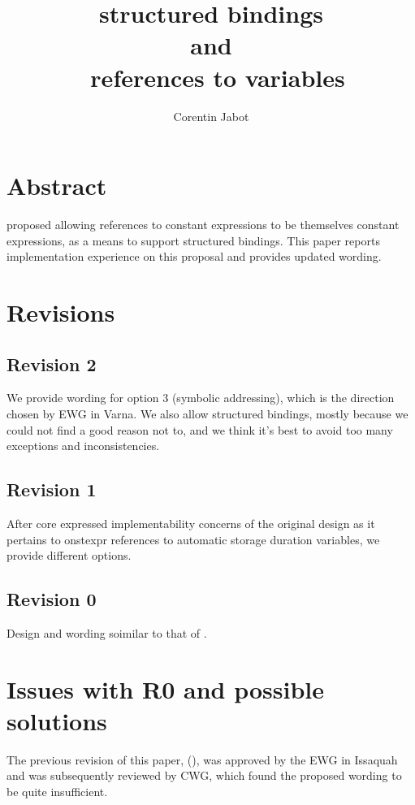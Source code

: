 \documentclass{wg21}
\title{\tcode{constexpr} structured bindings\\{\small and}\\\ references to \tcode{constexpr} variables}
\author{Corentin Jabot}{corentin.jabot@gmail.com}
\begin{document}
\maketitle

\section{Abstract}

 proposed allowing references to constant expressions to be themselves constant expressions,
as a means to support  structured bindings.
This paper reports implementation experience on this proposal and provides updated wording.


\section{Revisions}

\subsection{Revision 2}

We provide wording for option 3 (symbolic addressing), which is the direction chosen by EWG in Varna.
We also allow  structured bindings, mostly because we could not find a good reason not to,
and we think it's best to avoid too many exceptions and inconsistencies.

\subsection{Revision 1}

After core expressed implementability concerns of the original design as it pertains to onstexpr references to automatic storage duration variables,
we provide different options.

\subsection{Revision 0}

Design and wording soimilar to that of .

\section{Issues with R0 and possible solutions}

The previous revision of this paper, (), was approved by the EWG in Issaquah and was subsequently
reviewed by CWG, which found the proposed wording to be quite insufficient.
\end{document}
